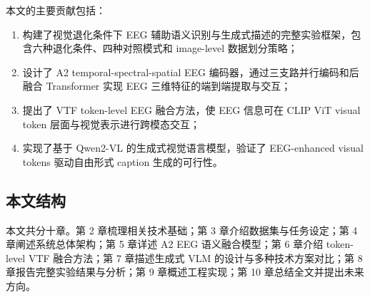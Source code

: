 本文的主要贡献包括：

\begin{enumerate}
  \item 构建了视觉退化条件下 EEG 辅助语义识别与生成式描述的完整实验框架，包含六种退化条件、四种对照模式和 image-level 数据划分策略；
  \item 设计了 A2 temporal-spectral-spatial EEG 编码器，通过三支路并行编码和后融合 Transformer 实现 EEG 三维特征的端到端提取与交互；
  \item 提出了 VTF token-level EEG 融合方法，使 EEG 信息可在 CLIP ViT visual token 层面与视觉表示进行跨模态交互；
  \item 实现了基于 Qwen2-VL 的生成式视觉语言模型，验证了 EEG-enhanced visual tokens 驱动自由形式 caption 生成的可行性。
\end{enumerate}

\subsection{本文结构}

本文共分十章。第 2 章梳理相关技术基础；第 3 章介绍数据集与任务设定；第 4 章阐述系统总体架构；第 5 章详述 A2 EEG 语义融合模型；第 6 章介绍 token-level VTF 融合方法；第 7 章描述生成式 VLM 的设计与多种技术方案对比；第 8 章报告完整实验结果与分析；第 9 章概述工程实现；第 10 章总结全文并提出未来方向。
